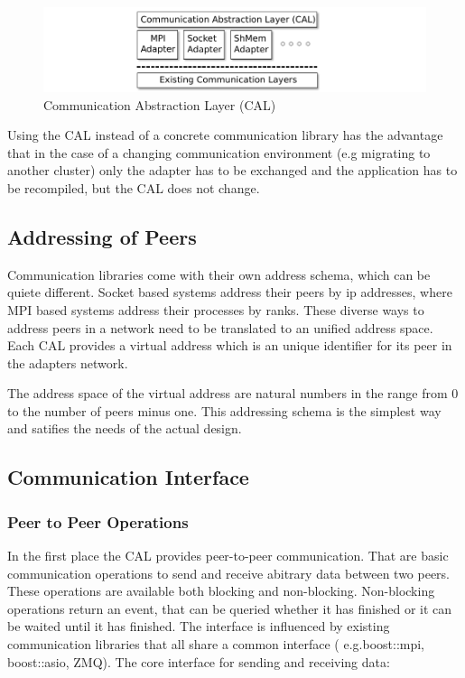 \begin{figure}[H]
  \centering \includegraphics[width=\textwidth]{graphics/30_cal}
  \caption{Communication Abstraction Layer (CAL)}
  \label{fig:cal}
\end{figure}

Using the CAL instead of a concrete communication library has the
advantage that in the case of a changing communication environment
(e.g migrating to another cluster) only the adapter has to be
exchanged and the application has to be recompiled, but the CAL does
not change.

\subsection{Addressing of Peers}
Communication libraries come with their own address schema, which can
be quiete different. Socket based systems address their peers by ip
addresses, where MPI based systems address their processes by ranks.
These diverse ways to address peers in a network need to be translated
to an unified address space. Each CAL provides a virtual address
which is an unique identifier for its peer in the adapters network.

The address space of the virtual address are natural numbers in 
the range from 0 to the number of peers minus one. This addressing
schema is the simplest way and satifies the needs of the actual design.

\subsection{Communication Interface}
\label{sec:cal_comm}
\subsubsection{Peer to Peer Operations}

In the first place the CAL provides peer-to-peer communication. That
are basic communication operations to send and receive abitrary data
between two peers. These operations are available both blocking and
non-blocking. Non-blocking operations return an event, that can be
queried whether it has finished or it can be waited until it has
finished. The interface is influenced by existing communication
libraries that all share a common interface ( e.g.boost::mpi,
boost::asio, ZMQ). The core interface for sending and receiving data:

